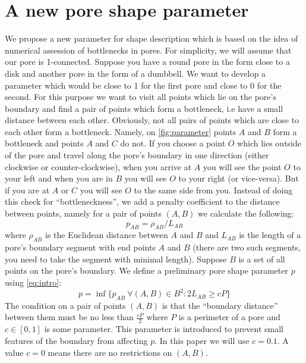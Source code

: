 \documentclass[reprint,amsmath,amssymb,aps,pre,showkeys,showpacs]{revtex4-1}
\begin{document}
\section{A new pore shape parameter}
We propose a new parameter for shape description which is based on the idea of
numerical assession of bottlenecks in pores. For simplicity, we will assume
that our pore is 1-connected. Suppose you have a round pore in the form close to
a disk and another pore in the form of a dumbbell. We want to develop a
parameter which would be close to 1 for the first pore and close to 0 for the
second. For this purpose we want to visit all points which lie on the pore's
boundary and find a pair of points which form a bottleneck, i.e have a small
distance between each other. Obviously, not all pairs of points which are close
to each other form a bottleneck. Namely, on \cref{fig:parameter} points $A$ and
$B$ form a bottleneck and points $A$ and $C$ do not. If you choose a point $O$
which lies outside of the pore and travel along the pore's boundary in one
direction (either clockwise or counter-clockwise), when you arrive at $A$ you
will see the point $O$ to your left and when you are in $B$ you will see $O$ to
your right (or vice-versa). But if you are at $A$ or $C$ you will see $O$ to the
same side from you. Instead of doing this check for ``bottleneckness'', we add a
penalty coefficient to the distance between points, namely for a pair of points
$(A, B)$ we calculate the following:
\begin{equation}
  p_{AB} = \rho_{AB} / L_{AB}
  \label{eq:intro}
\end{equation}
where $\rho_{AB}$ is the Euclidean distance between $A$ and $B$ and $L_{AB}$ is
the length of a pore's boundary segment with end points $A$ and $B$ (there are
two such segments, you need to take the segment with minimal length). Suppose
$B$ is a set of all points on the pore's boundary. We define a preliminary pore
shape parameter $p$ using \ref{eq:intro}:
\begin{equation}
  p = \inf \{ p_{AB} \ \forall (A, B) \in B^2 : 2 L_{AB} \ge cP \}
  \label{eq:pre-awesomeness}
\end{equation}
The condition on a pair of points $(A, B)$ is that the ``boundary distance''
between them must be no less than $\frac{cP}{2}$ where $P$ is a perimeter of a
pore and $c \in [0,1]$ is some parameter. This parameter is introduced to
prevent small features of the boundary from affecting $p$. In this paper we will
use $c = 0.1$. A value $c = 0$ means there are no restrictions on $(A, B)$.
\end{document}

